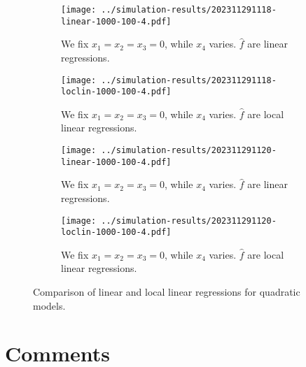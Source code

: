 \documentclass[12pt]{article}
\begin{document}
\begin{figure}[h]
    \centering
    \begin{subfigure}[b]{0.45\textwidth}
        \texttt{[image: ../simulation-results/202311291118-linear-1000-100-4.pdf]}
        \caption{We fix \(x_{1} = x_{2} = x_{3} = 0\), while \(x_{4}\) varies. \(\hat{f}\) are linear regressions.}
        \label{fig:9}
    \end{subfigure}
    \hfill
    \begin{subfigure}[b]{0.45\textwidth}
        \texttt{[image: ../simulation-results/202311291118-loclin-1000-100-4.pdf]}
        \caption{We fix \(x_{1} = x_{2} = x_{3} = 0\), while \(x_{4}\) varies. \(\hat{f}\) are local linear regressions.}
        \label{fig:10}
    \end{subfigure}
    \vfill
    \begin{subfigure}[b]{0.45\textwidth}
        \texttt{[image: ../simulation-results/202311291120-linear-1000-100-4.pdf]}
        \caption{We fix \(x_{1} = x_{2} = x_{3} = 0\), while \(x_{4}\) varies. \(\hat{f}\) are linear regressions.}
        \label{fig:11}
    \end{subfigure}
    \hfill
    \begin{subfigure}[b]{0.45\textwidth}
        \texttt{[image: ../simulation-results/202311291120-loclin-1000-100-4.pdf]}
        \caption{We fix \(x_{1} = x_{2} = x_{3} = 0\), while \(x_{4}\) varies. \(\hat{f}\) are local linear regressions.}
        \label{fig:12}
    \end{subfigure}
    \caption{Comparison of linear and local linear regressions for quadratic models.}
    \label{fig:comparison3}
\end{figure}
\newpage

\section{Comments}
\end{document}
